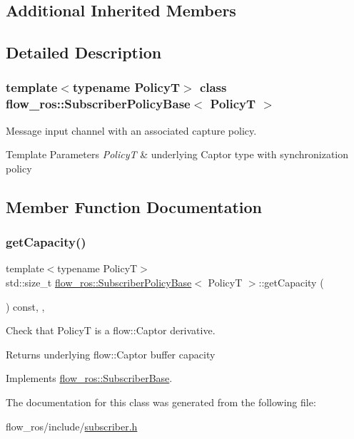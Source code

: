 \subsection*{Additional Inherited Members}


\subsection{Detailed Description}
\subsubsection*{template$<$typename PolicyT$>$\newline
class flow\+\_\+ros\+::\+Subscriber\+Policy\+Base$<$ Policy\+T $>$}

Message input channel with an associated capture policy. 


\begin{DoxyTemplParams}{Template Parameters}
{\em PolicyT} & underlying Captor type with synchronization policy \\
\hline
\end{DoxyTemplParams}


\subsection{Member Function Documentation}
\mbox{\label{classflow__ros_1_1_subscriber_policy_base_ad386c7963771122c13674afc5934c371}} 
\subsubsection{\texorpdfstring{get\+Capacity()}{getCapacity()}}
{\footnotesize\ttfamily template$<$typename PolicyT$>$ \\
std\+::size\+\_\+t \hyperlink{classflow__ros_1_1_subscriber_policy_base}{flow\+\_\+ros\+::\+Subscriber\+Policy\+Base}$<$ PolicyT $>$\+::get\+Capacity (\begin{DoxyParamCaption}{ }\end{DoxyParamCaption}) const\hspace{0.3cm}{\ttfamily [inline]}, {\ttfamily [final]}, {\ttfamily [virtual]}}



Check that PolicyT is a flow\+::\+Captor derivative. 

Returns underlying {\ttfamily flow\+::\+Captor} buffer capacity 

Implements \hyperlink{classflow__ros_1_1_subscriber_base_a25536a5f4b8a3c3dba3b581647e161b5}{flow\+\_\+ros\+::\+Subscriber\+Base}.



The documentation for this class was generated from the following file\+:\begin{DoxyCompactItemize}
\item 
flow\+\_\+ros/include/\hyperlink{subscriber_8h}{subscriber.\+h}\end{DoxyCompactItemize}
